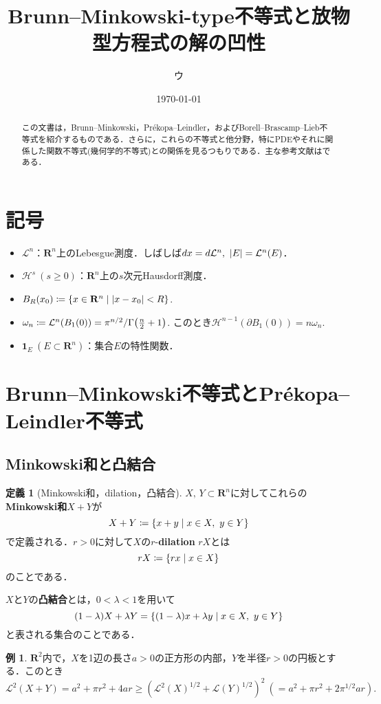\documentclass[a4j]{ltjsarticle}
\newcommand{\Rset}{\mathbf{R}}
\newcommand{\Lm}{\mathcal{L}}
\newcommand{\Hm}{\mathcal{H}}
\newcommand{\1}{\bm{1}}
\numberwithin{equation}{section}
\theoremstyle{definition}
\newtheorem{dfn}[thm]{定義}
\newtheorem{eg}[thm]{例}
\begin{document}
\title{Brunn--Minkowski-type不等式と放物型方程式の解の凹性}
\author{ウ}
\date{\today}
\maketitle
\begin{abstract}
    この文書は，Brunn--Minkowski，Pr\'ekopa--Leindler，およびBorell--Brascamp--Lieb不等式を紹介するものである．さらに，これらの不等式と他分野，特にPDEやそれに関係した関数不等式(幾何学的不等式)との関係を見るつもりである．主な参考文献は\cites{BL,G,ILS}である．
\end{abstract}
\tableofcontents
\section*{記号}
\begin{itemize}
    \item $\Lm^n$：$\Rset^n$上のLebesgue測度．しばしば$dx=d\Lm^n,\ \abs{E}=\Lm^n(E)$．
    \item $\Hm^s\ (s\geq0)$：$\Rset^n$上の$s$次元Hausdorff測度．
    \item $B_R(x_0)\coloneqq \qty{x\in \Rset^n \mid \abs{x-x_0}<R}$.
    \item $\omega_n\coloneqq\Lm^n(B_1(0))=\pi^{n/2}/\Gamma\qty(\frac{n}{2}+1)$. このとき$\Hm^{n-1}(\partial B_1(0))=n\omega_n$. 
    \item $\1_E\ (E\subset \Rset^n)$：集合$E$の特性関数．
\end{itemize}
\section{Brunn--Minkowski不等式とPr\'ekopa--Leindler不等式}
\subsection{Minkowski和と凸結合}
\begin{dfn}[Minkowski和，dilation，凸結合]
$X,\,Y\subset \Rset^n$に対してこれらの\textbf{Minkowski和}$X+Y$が
    \begin{equation}
        X+Y\coloneqq \qty{x+y\mid x\in X,\ y\in Y}
    \end{equation}
    で定義される．$r>0$に対して$X$の$r$-\textbf{dilation} $rX$とは 
    \begin{equation}
        rX\coloneqq \qty{rx\mid x\in X}
    \end{equation}
    のことである．
    
    $X$と$Y$の\textbf{凸結合}とは，$0<\lambda<1$を用いて
    \begin{equation}
        (1-\lambda) X+\lambda Y=\qty{(1-\lambda) x+\lambda y\mid x\in X,\ y\in Y}
    \end{equation}
    と表される集合のことである．
\end{dfn}
\begin{eg}
    $\Rset^2$内で，$X$を1辺の長さ$a>0$の正方形の内部，$Y$を半径$r>0$の円板とする．このとき
    \begin{equation}
        \Lm^2(X+Y)=a^2+\pi r^2+4ar\geq (\Lm^2(X)^{1/2}+\Lm(Y)^{1/2})^{2}\ (=a^2+\pi r^2+2\pi^{1/2}ar).
    \end{equation}
\end{eg}
\end{document}
